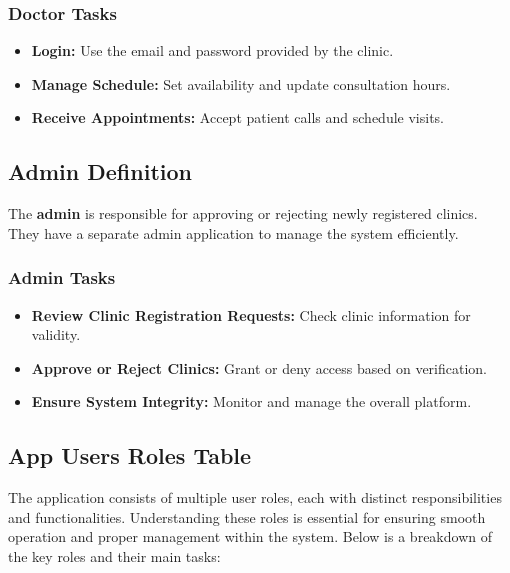 \documentclass[12pt]{report}
\begin{document}
\subsubsection{\textbf{Doctor Tasks}}
\begin{itemize}
	\item \textbf{Login:} Use the email and password provided by the clinic.
	\item \textbf{Manage Schedule:} Set availability and update consultation hours.
	\item \textbf{Receive Appointments:} Accept patient calls and schedule visits.
\end{itemize}

\vspace{0.5cm}


\subsection{\textbf{Admin Definition}}

\noindent The \textbf{admin} is responsible for approving or rejecting newly registered clinics. They have a separate admin application to manage the system efficiently.

\subsubsection{\textbf{Admin Tasks}}
\begin{itemize}
	\item \textbf{Review Clinic Registration Requests:} Check clinic information for validity.
	\item \textbf{Approve or Reject Clinics:} Grant or deny access based on verification.
	\item \textbf{Ensure System Integrity:} Monitor and manage the overall platform.
\end{itemize}






\subsection{App Users Roles Table}
\noindent The application consists of multiple user roles, each with distinct responsibilities and functionalities. Understanding these roles is essential for ensuring smooth operation and proper management within the system. Below is a breakdown of the key roles and their main tasks:

\renewcommand{\arraystretch}{1.3} %
\end{document}
